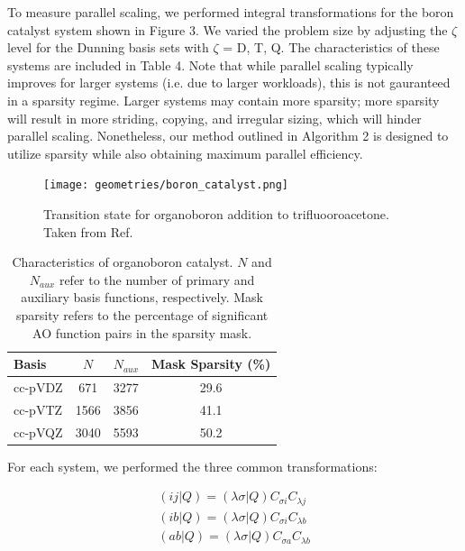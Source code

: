To measure parallel scaling, we performed integral transformations for the boron catalyst system shown in Figure 3. 
We varied the problem size by adjusting the $\zeta$ level for the Dunning basis sets with $\zeta$ = D, T, Q.
The characteristics of these systems are included in Table 4. Note that while parallel scaling typically improves
for larger systems (i.e. due to larger workloads),
this is not gauranteed in a sparsity regime. Larger systems may contain more sparsity;
more sparsity will result in more striding, copying, and irregular sizing,
which will hinder parallel scaling. Nonetheless, our method outlined in Algorithm 2 is designed to utilize sparsity while also
obtaining maximum parallel efficiency. 

\begin{figure}[H] 
\centering
\texttt{[image: geometries/boron\_catalyst.png]} \caption{Transition state for organoboron addition to trifluooroacetone. Taken from Ref. \cite{Lec:2016:768}} 
\label{fig:databases} \end{figure}

\begingroup
\begin{table}[H]
\centering
\renewcommand{\baselinestretch}{1}
\caption{Characteristics of organoboron catalyst.
$N$ and $N_{aux}$ refer to the number of primary and auxiliary basis functions, respectively.
Mask sparsity refers to the percentage of significant AO function pairs in the sparsity mask.}
\begin{tabular}{l ccc}
\multicolumn{1}{l}{\textbf{Basis}} &
\multicolumn{1}{c}{\textbf{$N$}} &
\multicolumn{1}{c}{\textbf{$N_{aux}$}} &
\multicolumn{1}{c}{\textbf{Mask Sparsity (\%)}} \\
\hline
cc-pVDZ   & 671  & 3277 & 29.6 \\          
cc-pVTZ   & 1566 & 3856 & 41.1 \\          
cc-pVQZ   & 3040 & 5593 & 50.2 \\          
\end{tabular}
\end{table}
\endgroup

\noindent For each system, we performed the three common transformations:

\begin{align} 
(i j | Q) = (\lambda \sigma | Q) C_{\sigma i} C_{\lambda j} \\
(i b | Q) = (\lambda \sigma | Q) C_{\sigma i} C_{\lambda b} \\
(a b | Q) = (\lambda \sigma | Q) C_{\sigma a} C_{\lambda b} 
\end{align}

